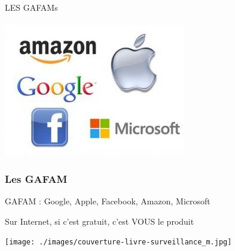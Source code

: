 \documentclass{beamer}
\begin{document}
\begin{frame}
\begin{center}
\Huge{LES GAFAMs}\\~\\
\includegraphics[scale=0.5] {./images/gafam.jpg} 
\end{center}
\end{frame}

\begin{frame}
\frametitle{Les GAFAM}
\begin{block}{GAFAM : Google, Apple, Facebook, Amazon, Microsoft}
\begin{itemize}
\end{itemize}
\end{block}
\end{frame}

\begin{frame}
\begin{center}
\Huge{Sur Internet, si c'est gratuit, c'est VOUS le produit}
\end{center}
\end{frame}


\begin{frame}
\begin{center}
\texttt{[image: ./images/couverture-livre-surveillance\_m.jpg]}
\end{center}
\end{frame}
\end{document}
